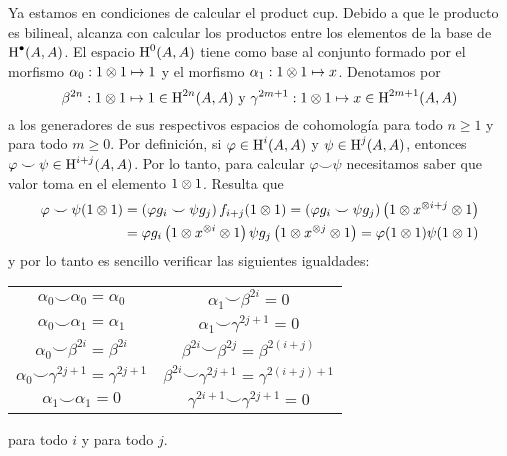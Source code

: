 \documentclass[a4paper,oneside,fleqn,11pt,../tesis.tex]{subfiles}
\begin{document}
\begin{example}
	Ya estamos en condiciones de calcular el product cup. Debido a que le producto es bilineal, alcanza con calcular
	los productos entre los elementos de la base de $\operatorname{H}^{\bullet}(A,A)$. El espacio $\operatorname{H}^{0}(A,A)$ tiene como
	base al conjunto formado por el morfismo $\alpha_0: 1\otimes 1 \mapsto 1$ y el morfismo $\alpha_1: 1\otimes 1 \mapsto x$.
	Denotamos por
	\[
		\beta^{2n} : 1\otimes 1 \mapsto 1 \in \operatorname{H}^{2n}(A, A) \text{ y } \gamma^{2m + 1} : 1\otimes 1 \mapsto x\in \operatorname{H}^{2m + 1}(A, A)
	\]
	a los generadores
	de sus respectivos espacios de cohomología para todo $n \geq 1$ y para todo $m \geq 0$. Por definición,
	si $\varphi \in \operatorname{H}^{i}(A,A)$ y $\psi \in \operatorname{H}^{j}(A,A)$, entonces $\varphi \smile \psi \in \operatorname{H}^{i + j}(A,A)$. Por lo tanto,
	para calcular $\varphi \smile \psi$ necesitamos saber que valor toma en el elemento $1\otimes 1$. Resulta que
	\begin{align*}
		\varphi \smile \psi(1 \otimes 1) &= \left(\varphi g_i \smile \psi g_j\right) f_{i + j}(1 \otimes 1)
			=  \left(\varphi g_i \smile \psi g_j\right)\left(1\otimes x^{\otimes i + j} \otimes 1\right)\\
		&= \varphi g_i\left(1\otimes x^{\otimes i} \otimes 1\right)\psi g_j\left(1\otimes x^{\otimes j} \otimes 1\right) = \varphi(1 \otimes 1)\psi(1 \otimes 1)
	\end{align*}
	y por lo tanto es sencillo verificar las siguientes igualdades:
	\begin{center}
	\begin{tabular}{ c c }
 		$\alpha_0 \smile \alpha_0 = \alpha_0$ & $\alpha_1 \smile \beta^{2i} = 0$ \\ 
 		$\alpha_0 \smile \alpha_1 = \alpha_1$ & $\alpha_1 \smile \gamma^{2j + 1} = 0$\\  
 		$\alpha_0 \smile \beta^{2i} = \beta^{2i}$ & $\beta^{2i} \smile \beta^{2j} = \beta^{2(i + j)}$ \\
 		$\alpha_0 \smile \gamma^{2j + 1} = \gamma^{2j + 1}$ & $\beta^{2i} \smile \gamma^{2j + 1} = \gamma^{2(i + j) + 1}$ \\
 		$\alpha_1 \smile \alpha_1 = 0$ & $\gamma^{2i + 1} \smile \gamma^{2j + 1} = 0$ \\  
	\end{tabular}
	\end{center}
	para todo $i$ y para todo $j$.
	

\end{example}
\end{document}
